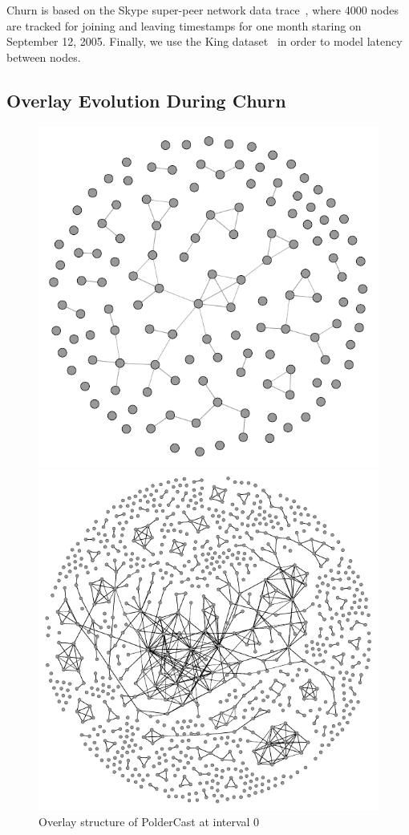 Churn is based on the Skype super-peer network data
trace~\cite{Guha:2006}, where 4000 nodes are tracked for joining and
leaving timestamps for one month staring on September 12, 2005. Finally,
we use the King dataset~\cite{king} in order to model latency between
nodes.

\subsection{Overlay Evolution During Churn}
\label{sec:churn}

\afterpage{\clearpage}
\begin{figure}[H]
    \vspace{-80pt}
    \centering
    \includegraphics[scale=0.5]{figures/churn_0}
    \caption{Overlay structure of PolderCast at interval 0}
    \label{fig:churn0}
    \includegraphics[scale=1]{figures/churn_250}

\end{figure}
